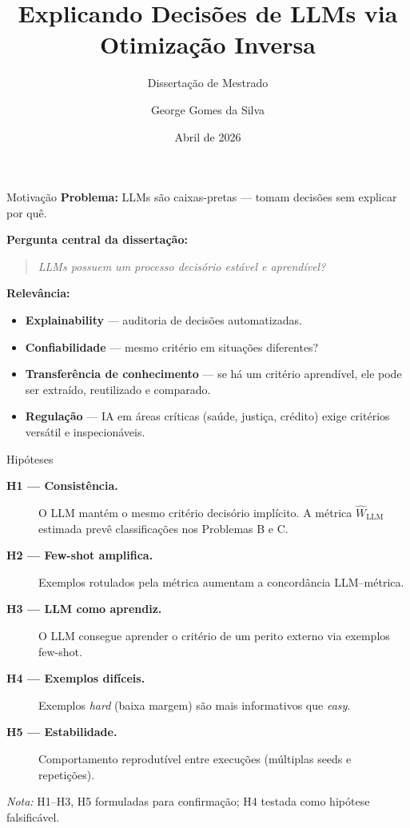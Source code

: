 \documentclass[aspectratio=169,10pt]{beamer}
\title[LLMs via Otimiza\c{c}\~ao Inversa]{Explicando Decis\~oes de LLMs via Otimiza\c{c}\~ao Inversa}
\subtitle{Disserta\c{c}\~ao de Mestrado}
\author{George Gomes da Silva}
\institute{Programa de P\'os-Gradua\c{c}\~ao em Inform\'atica}
\date{Abril de 2026}
\begin{document}
\begin{frame}
  \titlepage
\end{frame}

\begin{frame}{Motiva\c{c}\~ao}
  \textbf{Problema:} LLMs s\~ao caixas-pretas --- tomam decis\~oes sem explicar por qu\^e.
  \medskip

  \textbf{Pergunta central da disserta\c{c}\~ao:}
  \begin{quote}
    \emph{LLMs possuem um processo decis\'orio est\'avel e aprend\'ivel?}
  \end{quote}

  \textbf{Relev\^ancia:}
  \begin{itemize}
    \item \textbf{Explainability} --- auditoria de decis\~oes automatizadas.
    \item \textbf{Confiabilidade} --- mesmo crit\'erio em situa\c{c}\~oes diferentes?
    \item \textbf{Transfer\^encia de conhecimento} --- se h\'a um crit\'erio aprend\'ivel, ele pode ser extra\'ido, reutilizado e comparado.
    \item \textbf{Regula\c{c}\~ao} --- IA em \'areas cr\'iticas (sa\'ude, justi\c{c}a, cr\'edito) exige crit\'erios vers\'atil e inspecion\'aveis.
  \end{itemize}
\end{frame}

\begin{frame}{Hip\'oteses}
  \small
  \begin{description}
    \item[\textbf{H1 --- Consist\^encia.}] O LLM mant\'em o mesmo crit\'erio decis\'orio impl\'icito. A m\'etrica $\hat{W}_{\text{LLM}}$ estimada prev\^e classifica\c{c}\~oes nos Problemas B e C.
    \item[\textbf{H2 --- Few-shot amplifica.}] Exemplos rotulados pela m\'etrica aumentam a concord\^ancia LLM--m\'etrica.
    \item[\textbf{H3 --- LLM como aprendiz.}] O LLM consegue aprender o crit\'erio de um perito externo via exemplos few-shot.
    \item[\textbf{H4 --- Exemplos dif\'iceis.}] Exemplos \emph{hard} (baixa margem) s\~ao mais informativos que \emph{easy}.
    \item[\textbf{H5 --- Estabilidade.}] Comportamento reprodut\'ivel entre execu\c{c}\~oes (m\'ultiplas seeds e repeti\c{c}\~oes).
  \end{description}
  \bigskip

  \emph{Nota:} H1--H3, H5 formuladas para confirma\c{c}\~ao; H4 testada como hip\'otese falsific\'avel.
\end{frame}
\end{document}
